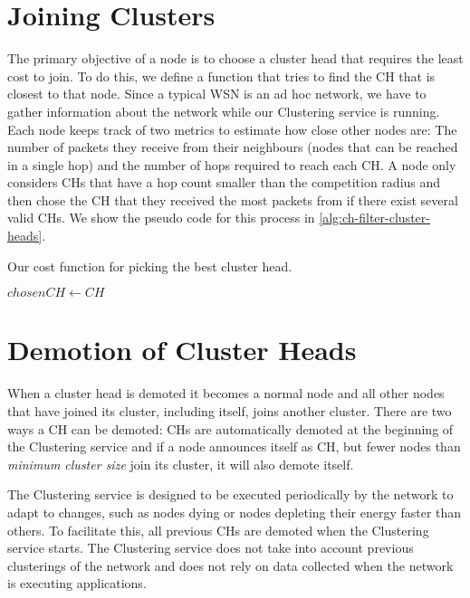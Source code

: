 \section{Joining Clusters}
The primary objective of a node is to choose a cluster head that requires the least cost to join. To do this, we define a function that tries to find the CH that is closest to that node. Since a typical WSN is an ad hoc network, we have to gather information about the network while our Clustering service is running. Each node keeps track of two metrics to estimate how close other nodes are: The number of packets they receive from their neighbours (nodes that can be reached in a single hop) and the number of hops required to reach each CH. A node only considers CHs that have a hop count smaller than the competition radius and then chose the CH that they received the most packets from if there exist several valid CHs. We show the pseudo code for this process in \cref{alg:ch-filter-cluster-heads}.

\begin{algorithm}
\caption{Our cost function for picking the best cluster head.}
\label{alg:ch-filter-cluster-heads}
\begin{algorithmic}[1]
                \State $chosenCH \gets CH$
            \EndIf
        \EndIf
    \EndFor
\EndProcedure
\end{algorithmic}
\end{algorithm}


\section{Demotion of Cluster Heads}
\label{sec:demoting-cluster-heads}
When a cluster head is demoted it becomes a normal node and all other nodes that have joined its cluster, including itself, joins another cluster. There are two ways a CH can be demoted: CHs are automatically demoted at the beginning of the Clustering service and if a node announces itself as CH, but fewer nodes than \emph{minimum cluster size} join its cluster, it will also demote itself.

The Clustering service is designed to be executed periodically by the network to adapt to changes, such as nodes dying or nodes depleting their energy faster than others. To facilitate this, all previous CHs are demoted when the Clustering service starts. The Clustering service does not take into account previous clusterings of the network and does not rely on data collected when the network is executing applications.

